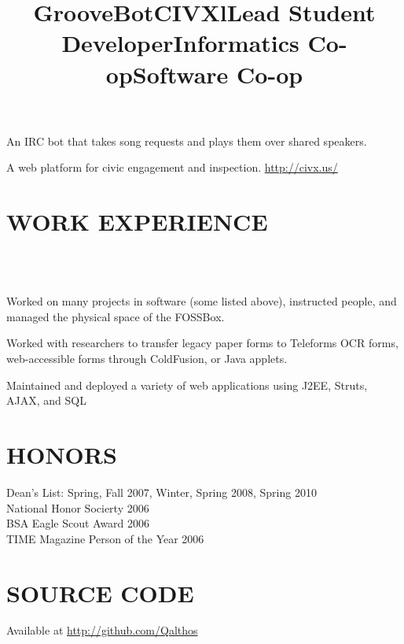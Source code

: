 \documentclass[line]{res}
\begin{document}
\begin{resume}
    \title{GrooveBot}
    \begin{position}
        An IRC bot that takes song requests and plays them over shared speakers.
    \end{position}

    \title{CIVX}
    \begin{position}
        A web platform for civic engagement and inspection. \url{http://civx.us/}
    \end{position}

\section{WORK EXPERIENCE}
    \begin{format}
        \title{l}\\
        \\
        \body
    \end{format}

    \title{Lead Student Developer}
    \begin{position}
        Worked on many projects in software (some listed above), instructed
        people, and managed the physical space of the FOSSBox.
    \end{position}

    \title{Informatics Co-op}
    \begin{position}
        Worked with researchers to transfer legacy paper forms to Teleforms OCR
        forms, web-accessible forms through ColdFusion, or Java applets.
    \end{position}

    \title{Software Co-op}
    \begin{position}
        Maintained and deployed a variety of web applications using J2EE,
        Struts, AJAX, and SQL
    \end{position}

\section{HONORS}
    Dean's List: Spring, Fall 2007, Winter, Spring 2008, Spring 2010 \\
    National Honor Socierty 2006 \\
    BSA Eagle Scout Award 2006 \\
    TIME Magazine Person of the Year 2006 \\

\section{SOURCE CODE}
    Available at \url{http://github.com/Qalthos}\\

\end{resume}
\end{document}
